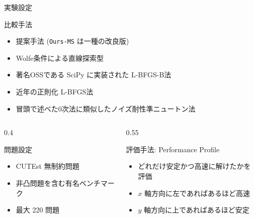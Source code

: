 \documentclass[dvipdfmx,12pt,aspectratio=169]{beamer}
\let\oldcitep\citep
\renewcommand{\citep}[1]{{\scriptsize \oldcitep{#1}}}
\begin{document}
\begin{frame}{実験設定}
  \begin{block}{比較手法}
    \begin{itemize}[leftmargin=4em]
      \item[\texttt{Ours}:] 提案手法 (\texttt{Ours-MS} は一種の改良版)
      \item[\texttt{Line}:] Wolfe条件による直線探索型
      \item[\texttt{SciPy}:] 著名OSSである SciPy に実装された L-BFGS-B法
      \item[\texttt{Reg}:] 近年の正則化 L-BFGS法 \citep{kanzowRegularizationLimitedMemory2023}
      \item[\texttt{NTQN}:] 冒頭で述べた0次法に類似したノイズ耐性準ニュートン法 \citep{shiNoiseTolerantQuasiNewtonAlgorithm2022}
    \end{itemize}
  \end{block}
  \begin{columns}
    \begin{column}{0.4\columnwidth}
      \begin{exampleblock}{問題設定}
        \begin{itemize}
          \item CUTEst 無制約問題
          \item 非凸問題を含む有名ベンチマーク
          \item 最大 220 問題
        \end{itemize}
      \end{exampleblock}
    \end{column}
    \begin{column}{0.55\columnwidth}
      \begin{exampleblock}{評価手法: Performance Profile}
        \begin{itemize}
          \item どれだけ安定かつ高速に解けたかを評価
          \item $x$ 軸方向に左であればあるほど高速
          \item $y$ 軸方向に上であればあるほど安定
        \end{itemize}
      \end{exampleblock}
    \end{column}
  \end{columns}
\end{frame}
\end{document}
